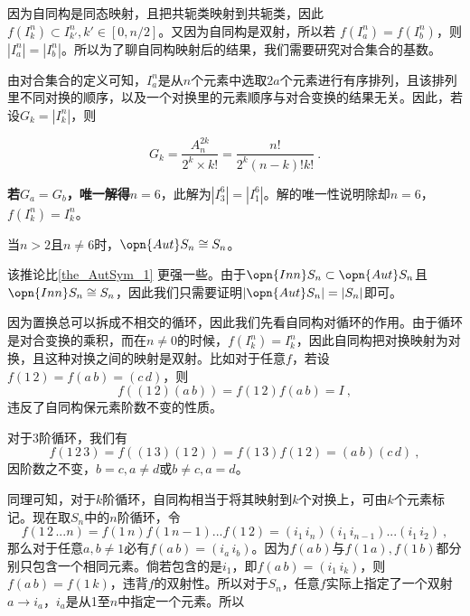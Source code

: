 因为自同构是同态映射，且把共轭类映射到共轭类，因此$f(I_k^n)\subset I_{k'}^n,k'\in [0,n/2]$。又因为自同构是双射，所以若 $f(I_a^n)=f(I_b^n)$，则$|I_a^n|=|I_b^n|$。所以为了聊自同构映射后的结果，我们需要研究对合集合的基数。

由对合集合的定义可知，$I_a^n$是从$n$个元素中选取$2a$个元素进行有序排列，且该排列里不同对换的顺序，以及一个对换里的元素顺序与对合变换的结果无关。因此，若设$G_k=|I_k^n|$，则

\begin{equation}
G_k=\frac{A_{n}^{2k}}{2^k\times k!}=\frac{n!}{2^k(n-k)!k!}~.
\end{equation}

\textbf{若$G_a=G_b$，唯一解得$n=6$}，此解为$|I^6_3|=|I^6_1|$。解的唯一性说明除却$n=6$，$f(I_k^n)=I_k^n$。

\begin{corollary}{}
当$n>2$且$n\neq 6$时，$\opn{Aut}S_n\cong S_n$。
\end{corollary}
该推论比\autoref{the_AutSym_1} 更强一些。由于$\opn{Inn}S_n\subset \opn{Aut} S_n$且$\opn{Inn}S_n\cong S_n$，因此我们只需要证明$|\opn{Aut}S_n|=|S_n|$即可。

因为置换总可以拆成不相交的循环，因此我们先看自同构对循环的作用。由于循环是对合变换的乘积，而在$n\neq 0$的时候，$f(I_k^n)=I_k^n$，因此自同构把对换映射为对换，且这种对换之间的映射是双射。比如对于任意$f$，若设$f(1\,2)=f(a\,b)=(c\,d)$，则
\begin{equation}
f((1\,2)(a\,b))=f(1\,2)f(a\,b)=I~,
\end{equation}
违反了自同构保元素阶数不变的性质。

对于3阶循环，我们有
\begin{equation}
f(1\,2\,3)=f((1\,3)(1\,2))=f(1\,3)f(1\,2)=(a\,b)(c\,d)~,
\end{equation}
因阶数之不变，$b=c,a\neq d$或$b\neq c,a=d$。

同理可知，对于$k$阶循环，自同构相当于将其映射到$k$个对换上，可由$k$个元素标记。现在取$S_n$中的$n$阶循环，令
\begin{equation}
f(1\,2\,...n)=f(1\,n)f(1\,n-1)...f(1\,2)=(i_1\,i_n)(i_1\,i_{n-1})...(i_1\,i_2)~,
\end{equation}
那么对于任意$a,b\neq 1$必有$f(a\,b)=(i_a\,i_b)$。因为$f(a\,b)$与$f(1\,a),f(1\,b)$都分别只包含一个相同元素。倘若包含的是$i_1$，即$f(a\,b)=(i_1\,i_k)$，则$f(a\,b)=f(1\,k)$，违背$f$的双射性。所以对于$S_n$，任意$f$实际上指定了一个双射$a\rightarrow i_a$，$i_a$是从1至$n$中指定一个元素。所以
